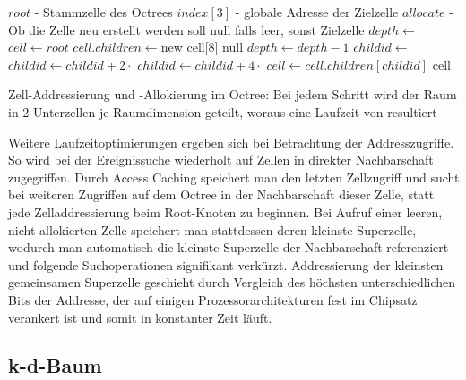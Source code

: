 \begin{algorithm}
  \begin{algorithmic}
    \Input $root$ - Stammzelle des Octrees
    \Input $index[3]$ - globale Adresse der Zielzelle
    \Input $allocate$ - Ob die Zelle neu erstellt werden soll
    \Result null falls leer, sonst Zielzelle
    \State
    \State $depth \gets $
    \State $cell \gets root$
    \State $cell.children \gets $new cell[8]
    \Else
    \State \Return null
    \EndIf
    \EndIf
    \State $depth \gets depth-1$
    \State $childid \gets $
    \State $childid \gets childid+2\cdot$
    \State $childid \gets childid+4\cdot$
    \State {}
    \State $cell \gets cell.children[childid]$
    \EndWhile
    \State\Return cell
    \EndFunction
  \end{algorithmic}
  \caption[Zell-Addressierung in Octrees]{Zell-Addressierung und -Allokierung im Octree: Bei jedem Schritt wird der Raum in 2 Unterzellen je Raumdimension geteilt, woraus eine Laufzeit von  resultiert}
  \label{algo:octree-adressing}
\end{algorithm}

Weitere Laufzeitoptimierungen ergeben sich bei Betrachtung der Addresszugriffe.
So wird bei der Ereignissuche wiederholt auf Zellen in direkter Nachbarschaft zugegriffen.
Durch Access Caching speichert man den letzten Zellzugriff und sucht bei weiteren Zugriffen auf dem Octree in der Nachbarschaft dieser Zelle, statt jede Zelladdressierung beim Root-Knoten zu beginnen.
Bei Aufruf einer leeren, nicht-allokierten Zelle speichert man stattdessen deren kleinste Superzelle, wodurch man automatisch die kleinste Superzelle der Nachbarschaft referenziert und folgende Suchoperationen signifikant verkürzt.
Addressierung der kleinsten gemeinsamen Superzelle geschieht durch Vergleich des höchsten unterschiedlichen Bits der Addresse, der auf einigen Prozessorarchitekturen fest im Chipsatz verankert ist und somit in konstanter Zeit läuft.


\subsection{k-d-Baum}


